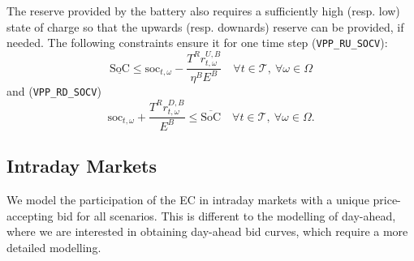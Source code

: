 \documentclass{article}
\newcommand{\SOC}{\text{SoC}}
\newcommand{\soc}{\text{soc}}
\begin{document}
The reserve provided by the battery also requires a sufficiently high (resp. low) state of charge so that the upwards (resp. downards) reserve can be provided, if needed. The following constraints ensure it for one time step (\verb|VPP_RU_SOCV|):
\begin{equation} \label{EQ:VPP_RU_SOCV}
	\underline{\SOC} \leq \soc_{t, \omega} - \frac{T^R r^{U, B}_{t, \omega}}{\eta^B E^B} \quad \forall t \in \mathcal{T}, \ \forall \omega \in \Omega
\end{equation}
and  (\verb|VPP_RD_SOCV|)
\begin{equation} \label{EQ:VPP_RD_SOCV}
	\soc_{t, \omega} + \frac{T^R r^{D, B}_{t, \omega} }{E^B} \leq \overline{\SOC} \quad \forall t \in \mathcal{T}, \ \forall \omega \in \Omega.
\end{equation}

\subsection{Intraday Markets}

We model the participation of the EC in intraday markets with a unique price-accepting bid for all scenarios. This is different to the modelling of day-ahead, where we are interested in obtaining day-ahead bid curves, which require a more detailed modelling.

\end{document}
